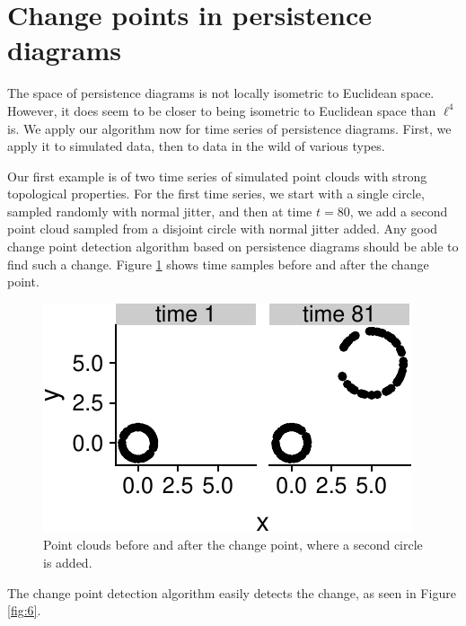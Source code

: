 \documentclass[smallextended]{svjour3}       %
\begin{document}
\section{Change points in persistence diagrams}\label{sec:2}

The space of persistence diagrams is not locally isometric to Euclidean
space. However, it does seem to be closer to being isometric to
Euclidean space than \(\ell^4\) is. We apply our algorithm now for time
series of persistence diagrams. First, we apply it to simulated data,
then to data in the wild of various types.

\begin{example}\label{ex:3} Our first example is of two time series of simulated point clouds with strong topological properties. For the first time series, we start with a single circle, sampled randomly with normal jitter, and then at time \(t = 80\), we add a second point cloud sampled from a disjoint circle with normal jitter added. Any good change point detection algorithm based on persistence diagrams should be able to find such a change. Figure \ref{fig:5} shows time samples before and after the change point.

\begin{figure}[H]\includegraphics{springer_template_files/figure-latex/chunk_6-1}
\caption{Point clouds before and after the change point, where a second circle is added.}
 \label{fig:5}\end{figure}

The change point detection algorithm easily detects the change, as seen in Figure \ref{fig:6}. 


\end{example}
\end{document}
